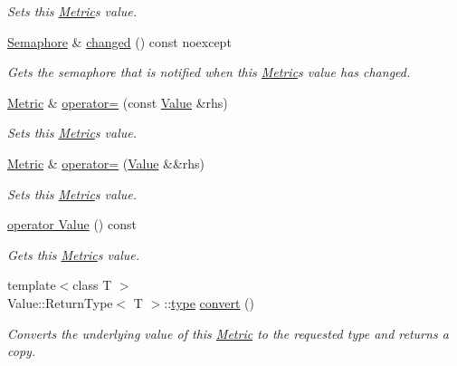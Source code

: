 \begin{DoxyCompactItemize}
\begin{DoxyCompactList}\small\item\em Sets this \hyperlink{classdg_1_1deepcore_1_1_metric}{Metric}\textquotesingle{}s value. \end{DoxyCompactList}\item 
\hyperlink{classdg_1_1deepcore_1_1_semaphore}{Semaphore} \& \hyperlink{classdg_1_1deepcore_1_1_metric_abfe9d5ee8727333300f6211fb598e909}{changed} () const noexcept
\begin{DoxyCompactList}\small\item\em Gets the semaphore that is notified when this \hyperlink{classdg_1_1deepcore_1_1_metric}{Metric}\textquotesingle{}s value has changed. \end{DoxyCompactList}\item 
\hyperlink{classdg_1_1deepcore_1_1_metric}{Metric} \& \hyperlink{classdg_1_1deepcore_1_1_metric_add916e062f783883b39ec55a794e7c3d}{operator=} (const \hyperlink{classdg_1_1deepcore_1_1_value}{Value} \&rhs)
\begin{DoxyCompactList}\small\item\em Sets this \hyperlink{classdg_1_1deepcore_1_1_metric}{Metric}\textquotesingle{}s value. \end{DoxyCompactList}\item 
\hyperlink{classdg_1_1deepcore_1_1_metric}{Metric} \& \hyperlink{classdg_1_1deepcore_1_1_metric_a3b4ac859c91f555217f6c86868ae9622}{operator=} (\hyperlink{classdg_1_1deepcore_1_1_value}{Value} \&\&rhs)
\begin{DoxyCompactList}\small\item\em Sets this \hyperlink{classdg_1_1deepcore_1_1_metric}{Metric}\textquotesingle{}s value. \end{DoxyCompactList}\item 
\hyperlink{classdg_1_1deepcore_1_1_metric_ab310817e29f1fd8f21c4e8046c9d4fed}{operator Value} () const 
\begin{DoxyCompactList}\small\item\em Gets this \hyperlink{classdg_1_1deepcore_1_1_metric}{Metric}\textquotesingle{}s value. \end{DoxyCompactList}\item 
{\footnotesize template$<$class T $>$ }\\Value\+::\+Return\+Type$<$ T $>$\+::\hyperlink{classdg_1_1deepcore_1_1_object_a80356589437cb086680c6b5fbd8044d4}{type} \hyperlink{classdg_1_1deepcore_1_1_metric_a5b0f2e859ea95562412e18057cf81024}{convert} ()
\begin{DoxyCompactList}\small\item\em Converts the underlying value of this \hyperlink{classdg_1_1deepcore_1_1_metric}{Metric} to the requested type and returns a copy. \end{DoxyCompactList}\end{DoxyCompactItemize}
